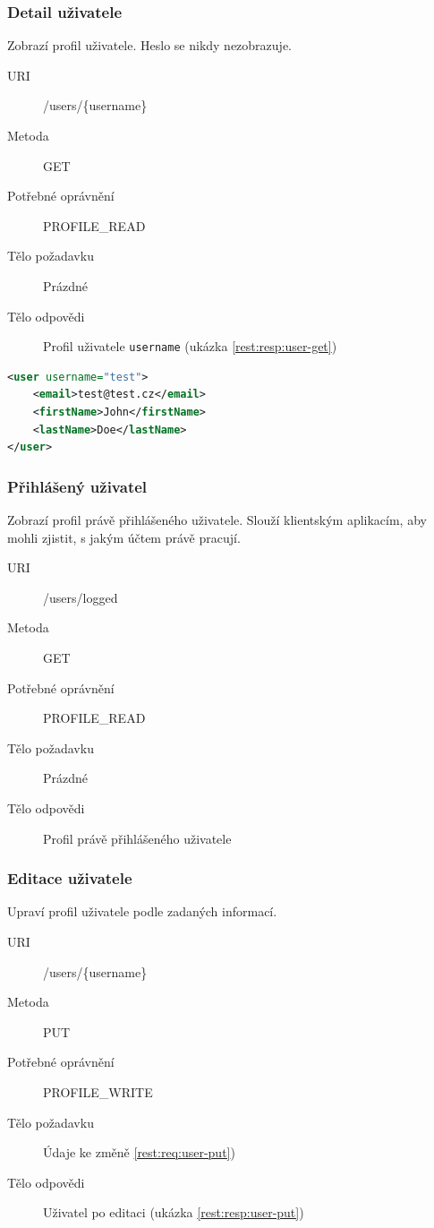 \documentclass[thesis=M,czech]{FITthesis}[2014/05/6]
\begin{document}
\subsubsection{Detail uživatele}
Zobrazí profil uživatele. Heslo se nikdy nezobrazuje.
\begin{description}
  \item[URI] /users/\{username\}
  \item[Metoda] GET
  \item[Potřebné oprávnění] PROFILE\_READ
  \item[Tělo požadavku] Prázdné
  \item[Tělo odpovědi] Profil uživatele \texttt{username} (ukázka \ref{rest:resp:user-get})
\end{description}

\begin{lstlisting}[caption=Tělo odpovědi zdroje /users/\{username\} (GET), label=rest:resp:user-get, language=xml]
<user username="test">
    <email>test@test.cz</email>
    <firstName>John</firstName>
    <lastName>Doe</lastName>
</user>
\end{lstlisting}  

\subsubsection{Přihlášený uživatel}
Zobrazí profil právě přihlášeného uživatele. Slouží klientským aplikacím, aby mohli zjistit, s jakým účtem právě pracují.
\begin{description}
  \item[URI] /users/logged
  \item[Metoda] GET
  \item[Potřebné oprávnění] PROFILE\_READ
  \item[Tělo požadavku] Prázdné
  \item[Tělo odpovědi] Profil právě přihlášeného uživatele
\end{description}

\subsubsection{Editace uživatele}
Upraví profil uživatele podle zadaných informací.
\begin{description}
  \item[URI] /users/\{username\}
  \item[Metoda] PUT
  \item[Potřebné oprávnění] PROFILE\_WRITE
  \item[Tělo požadavku] Údaje ke změně \ref{rest:req:user-put})
  \item[Tělo odpovědi] Uživatel po editaci (ukázka \ref{rest:resp:user-put})
\end{description}
\end{document}
